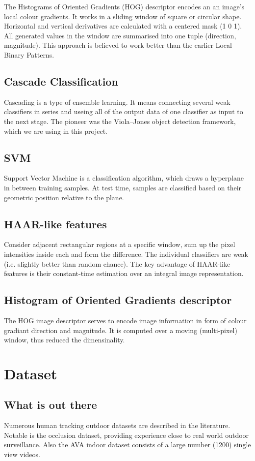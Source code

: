 \documentclass{article}
\begin{document}
The Histograms of Oriented Gradients (HOG)\cite{hog} descriptor encodes an an image's local colour gradients.
It works in a sliding window of square or circular shape.
Horizontal and vertical derivatives are calculated with a centered mask (1 0 1).
All generated values in the window are summarised into one tuple (direction, magnitude).
This approach is believed to work better than the earlier Local Binary Patterns.

\subsection{Cascade Classification}
Cascading is a type of ensemble learning.
It means connecting several weak classifiers in series and useing all of the output data of one classifier as input to the next stage.
The pioneer was the Viola–Jones object detection framework, which we are using in this project.


\subsection{SVM}
Support Vector Machine is a classification algorithm, which draws a hyperplane in between training samples.
At test time, samples are classified based on their geometric position relative to the plane.


\subsection{HAAR-like features}
Consider adjacent rectangular regions at a specific window, sum up the pixel intensities inside each and form the difference.
The individual classifiers are weak (i.e. slightly better than random chance).
The key advantage of HAAR-like features is their constant-time estimation over an integral image representation.


\subsection{Histogram of Oriented Gradients descriptor}
The HOG image descriptor serves to encode image information in form of colour gradiant direction and magnitude.
It is computed over a moving (multi-pixel) window, thus reduced the dimensinality.


\section{Dataset}
\subsection{What is out there}
Numerous human tracking outdoor datasets are described in the literature\cite{datasets0}\cite{datasets1}.
Notable is the occlusion dataset\cite{datasets2}, providing experience close to real world outdoor surveillance.
Also the AVA indoor dataset\cite{ava} consists of a large number (1200) single view videos.
\end{document}
